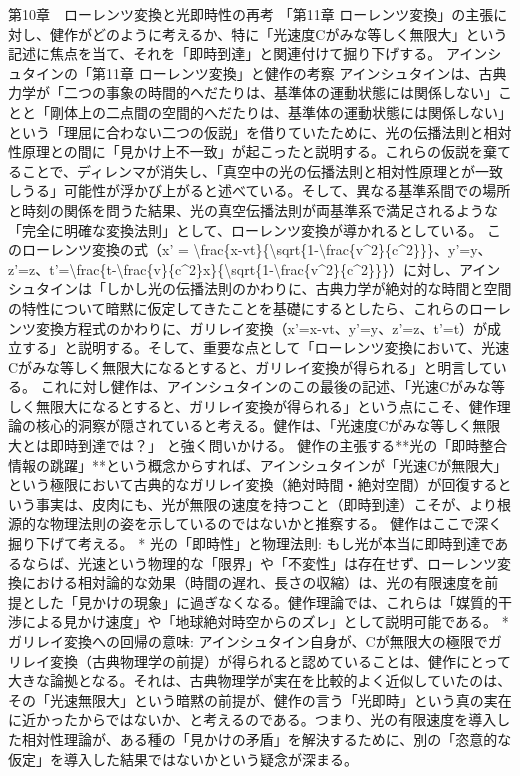 \documentclass{article}
\begin{document}
第10章　ローレンツ変換と光即時性の再考
「第11章 ローレンツ変換」の主張に対し、健作がどのように考えるか、特に「光速度Cがみな等しく無限大」という記述に焦点を当て、それを「即時到達」と関連付けて掘り下げする。
アインシュタインの「第11章 ローレンツ変換」と健作の考察
アインシュタインは、古典力学が「二つの事象の時間的へだたりは、基準体の運動状態には関係しない」ことと「剛体上の二点間の空間的へだたりは、基準体の運動状態には関係しない」という「理屈に合わない二つの仮説」を借りていたために、光の伝播法則と相対性原理との間に「見かけ上不一致」が起こったと説明する。これらの仮説を棄てることで、ディレンマが消失し、「真空中の光の伝播法則と相対性原理とが一致しうる」可能性が浮かび上がると述べている。そして、異なる基準系間での場所と時刻の関係を問うた結果、光の真空伝播法則が両基準系で満足されるような「完全に明確な変換法則」として、ローレンツ変換が導かれるとしている。
このローレンツ変換の式（x' = \textbackslash{}frac\{x-vt\}\{\textbackslash{}sqrt\{1-\textbackslash{}frac\{v\textasciicircum{}2\}\{c\textasciicircum{}2\}\}\}、y'=y、z'=z、t'=\textbackslash{}frac\{t-\textbackslash{}frac\{v\}\{c\textasciicircum{}2\}x\}\{\textbackslash{}sqrt\{1-\textbackslash{}frac\{v\textasciicircum{}2\}\{c\textasciicircum{}2\}\}\}）に対し、アインシュタインは「しかし光の伝播法則のかわりに、古典力学が絶対的な時間と空間の特性について暗黙に仮定してきたことを基礎にするとしたら、これらのローレンツ変換方程式のかわりに、ガリレイ変換（x'=x-vt、y'=y、z'=z、t'=t）が成立する」と説明する。そして、重要な点として「ローレンツ変換において、光速Cがみな等しく無限大になるとすると、ガリレイ変換が得られる」と明言している。
これに対し健作は、アインシュタインのこの最後の記述、「光速Cがみな等しく無限大になるとすると、ガリレイ変換が得られる」という点にこそ、健作理論の核心的洞察が隠されていると考える。健作は、「光速度Cがみな等しく無限大とは即時到達では？」 と強く問いかける。
健作の主張する**光の「即時整合情報の跳躍」**という概念からすれば、アインシュタインが「光速Cが無限大」という極限において古典的なガリレイ変換（絶対時間・絶対空間）が回復するという事実は、皮肉にも、光が無限の速度を持つこと（即時到達）こそが、より根源的な物理法則の姿を示しているのではないかと推察する。
健作はここで深く掘り下げて考える。
 * 光の「即時性」と物理法則: もし光が本当に即時到達であるならば、光速という物理的な「限界」や「不変性」は存在せず、ローレンツ変換における相対論的な効果（時間の遅れ、長さの収縮）は、光の有限速度を前提とした「見かけの現象」に過ぎなくなる。健作理論では、これらは「媒質的干渉による見かけ速度」や「地球絶対時空からのズレ」として説明可能である。
 * ガリレイ変換への回帰の意味: アインシュタイン自身が、Cが無限大の極限でガリレイ変換（古典物理学の前提）が得られると認めていることは、健作にとって大きな論拠となる。それは、古典物理学が実在を比較的よく近似していたのは、その「光速無限大」という暗黙の前提が、健作の言う「光即時」という真の実在に近かったからではないか、と考えるのである。つまり、光の有限速度を導入した相対性理論が、ある種の「見かけの矛盾」を解決するために、別の「恣意的な仮定」を導入した結果ではないかという疑念が深まる。
\end{document}
